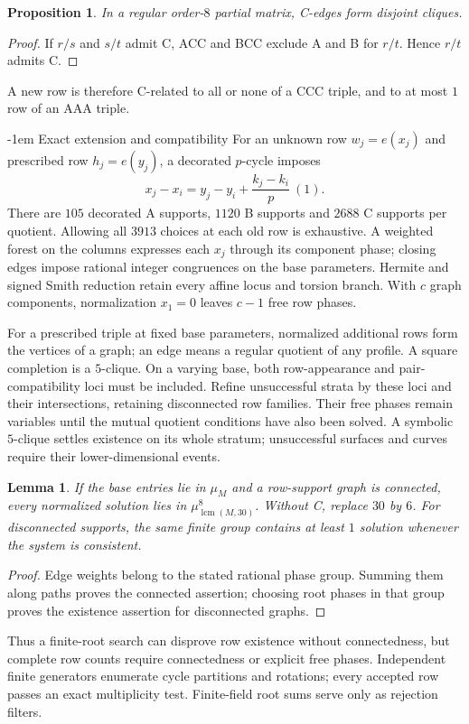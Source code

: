 \documentclass[11pt,a4paper]{article}
\makeatletter
\newtheorem{proposition}[theorem]{Proposition}
\newtheorem{lemma}[theorem]{Lemma}
\theoremstyle{plain}
\theoremstyle{definition}
\numberwithin{equation}{section}
\renewcommand\subsection{\@startsection{subsection}{2}{\z@}  {\medskipamount}  {-1em}  {\normalfont\normalsize\bfseries}}
\makeatother
\begin{document}
\begin{proposition}\label{prop:Ccliques}
In a regular order-$8$ partial matrix, C-edges form disjoint cliques.
\end{proposition}
\begin{proof}
If $r/s$ and $s/t$ admit C, ACC and BCC exclude A and B for $r/t$. Hence $r/t$ admits C.
\end{proof}
A new row is therefore C-related to all or none of a CCC triple, and to at most $1$ row of an AAA triple.

\subsection{Exact extension and compatibility}\label{sec:method}
For an unknown row $w_j=e(x_j)$ and prescribed row $h_j=e(y_j)$, a decorated $p$-cycle imposes
$$x_j-x_i=y_j-y_i+\frac{k_j-k_i}{p}\ (1).$$
There are $105$ decorated A supports, $1120$ B supports and $2688$ C supports per quotient. Allowing all $3913$ choices at each old row is exhaustive. A weighted forest on the columns expresses each $x_j$ through its component phase; closing edges impose rational integer congruences on the base parameters. Hermite and signed Smith reduction retain every affine locus and torsion branch. With $c$ graph components, normalization $x_1=0$ leaves $c-1$ free row phases.

For a prescribed triple at fixed base parameters, normalized additional rows form the vertices of a graph; an edge means a regular quotient of any profile. A square completion is a $5$-clique. On a varying base, both row-appearance and pair-compatibility loci must be included. Refine unsuccessful strata by these loci and their intersections, retaining disconnected row families. Their free phases remain variables until the mutual quotient conditions have also been solved. A symbolic $5$-clique settles existence on its whole stratum; unsuccessful surfaces and curves require their lower-dimensional events.

\begin{lemma}
If the base entries lie in $\mu_M$ and a row-support graph is connected, every normalized solution lies in $\mu_{\operatorname{lcm}(M,30)}^8$. Without C, replace $30$ by $6$. For disconnected supports, the same finite group contains at least $1$ solution whenever the system is consistent.
\end{lemma}
\begin{proof}
Edge weights belong to the stated rational phase group. Summing them along paths proves the connected assertion; choosing root phases in that group proves the existence assertion for disconnected graphs.
\end{proof}
Thus a finite-root search can disprove row existence without connectedness, but complete row counts require connectedness or explicit free phases. Independent finite generators enumerate cycle partitions and rotations; every accepted row passes an exact multiplicity test. Finite-field root sums serve only as rejection filters.
\end{document}
